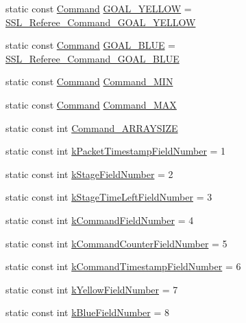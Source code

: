 \begin{DoxyCompactItemize}
\item 
static const \hyperlink{referee_8pb_8h_a25bd5aba081a4c85e54d6ed275358d79}{Command} \hyperlink{class_s_s_l___referee_a92380665f0de0a170f5bc375c01b2d22}{G\-O\-A\-L\-\_\-\-Y\-E\-L\-L\-O\-W} = \hyperlink{referee_8pb_8h_a25bd5aba081a4c85e54d6ed275358d79ac2fe347635a421ac675c7690affa6467}{S\-S\-L\-\_\-\-Referee\-\_\-\-Command\-\_\-\-G\-O\-A\-L\-\_\-\-Y\-E\-L\-L\-O\-W}
\item 
static const \hyperlink{referee_8pb_8h_a25bd5aba081a4c85e54d6ed275358d79}{Command} \hyperlink{class_s_s_l___referee_ab94e834fdb7b4008573bc6fb0cbdc98a}{G\-O\-A\-L\-\_\-\-B\-L\-U\-E} = \hyperlink{referee_8pb_8h_a25bd5aba081a4c85e54d6ed275358d79aef049c885298a0ffe90611ccfe0e83e4}{S\-S\-L\-\_\-\-Referee\-\_\-\-Command\-\_\-\-G\-O\-A\-L\-\_\-\-B\-L\-U\-E}
\item 
static const \hyperlink{referee_8pb_8h_a25bd5aba081a4c85e54d6ed275358d79}{Command} \hyperlink{class_s_s_l___referee_a7848f5c6d741aa47a3fe2b57fb1048c1}{Command\-\_\-\-M\-I\-N}
\item 
static const \hyperlink{referee_8pb_8h_a25bd5aba081a4c85e54d6ed275358d79}{Command} \hyperlink{class_s_s_l___referee_a29a235caf4f725e8644b45d35710f9f5}{Command\-\_\-\-M\-A\-X}
\item 
static const int \hyperlink{class_s_s_l___referee_aad143983ce8c9f7e465a02c89f29f912}{Command\-\_\-\-A\-R\-R\-A\-Y\-S\-I\-Z\-E}
\item 
static const int \hyperlink{class_s_s_l___referee_a2a2ebca89ac6156febf304735e943c20}{k\-Packet\-Timestamp\-Field\-Number} = 1
\item 
static const int \hyperlink{class_s_s_l___referee_a8d900441186c9193713250034b7cef91}{k\-Stage\-Field\-Number} = 2
\item 
static const int \hyperlink{class_s_s_l___referee_acedb565c586dd8840639c2312aac4009}{k\-Stage\-Time\-Left\-Field\-Number} = 3
\item 
static const int \hyperlink{class_s_s_l___referee_a9c2bd1bc913032ef7039e56f4b1a51ed}{k\-Command\-Field\-Number} = 4
\item 
static const int \hyperlink{class_s_s_l___referee_abd7489ff03bda4d168ff5fa6a36ee64a}{k\-Command\-Counter\-Field\-Number} = 5
\item 
static const int \hyperlink{class_s_s_l___referee_a1d9bab9b1f494798c46898501624bec4}{k\-Command\-Timestamp\-Field\-Number} = 6
\item 
static const int \hyperlink{class_s_s_l___referee_ab87b80c7e640dcfe1d1d415e1d06a2b8}{k\-Yellow\-Field\-Number} = 7
\item 
static const int \hyperlink{class_s_s_l___referee_a2b27a50fa2e78a4e14ff24ec5a45f8b4}{k\-Blue\-Field\-Number} = 8
\end{DoxyCompactItemize}
